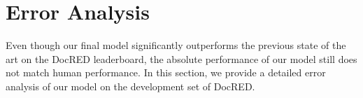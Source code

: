 \documentclass[11pt]{article}
\begin{document}
\section{Error Analysis}
\label{sec:error-analysis}


Even though our final model significantly outperforms the previous state of the art on the DocRED leaderboard, the absolute performance of our model still does not match human performance. In this section, we provide a detailed error analysis of our model on the development set of DocRED.

\begin{table}[ht]
\newcommand{\multirot}[1]{\multirow{4}{*}[1.0ex]{\rotcell{\rlap{#1}}}}
\centering
\def\arraystretch{1.0}
\caption{Statistics of our error distribution. The final evaluation score is evaluated on $r \in $ \textbf{R} triples, hence the correct predictions of \textbf{NR} are ignored when calculating the final scores.}
\label{tab:error-types}
\end{table}
\end{document}
